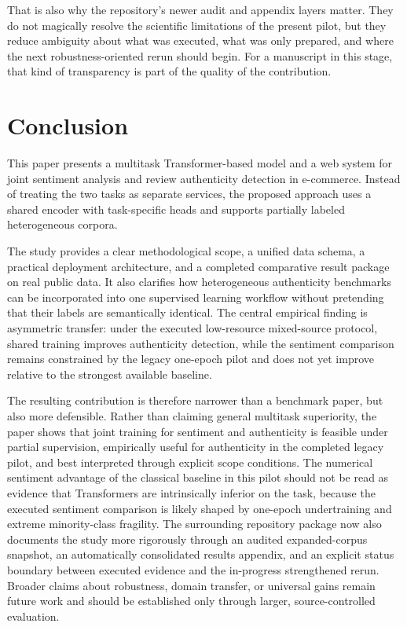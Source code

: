 \documentclass[12pt,a4paper]{article}
\begin{document}
That is also why the repository's newer audit and appendix layers matter. They do not magically resolve the scientific limitations of the present pilot, but they reduce ambiguity about what was executed, what was only prepared, and where the next robustness-oriented rerun should begin. For a manuscript in this stage, that kind of transparency is part of the quality of the contribution.

\section{Conclusion}

This paper presents a multitask Transformer-based model and a web system for joint sentiment analysis and review authenticity detection in e-commerce. Instead of treating the two tasks as separate services, the proposed approach uses a shared encoder with task-specific heads and supports partially labeled heterogeneous corpora.

The study provides a clear methodological scope, a unified data schema, a practical deployment architecture, and a completed comparative result package on real public data. It also clarifies how heterogeneous authenticity benchmarks can be incorporated into one supervised learning workflow without pretending that their labels are semantically identical. The central empirical finding is asymmetric transfer: under the executed low-resource mixed-source protocol, shared training improves authenticity detection, while the sentiment comparison remains constrained by the legacy one-epoch pilot and does not yet improve relative to the strongest available baseline.

The resulting contribution is therefore narrower than a benchmark paper, but also more defensible. Rather than claiming general multitask superiority, the paper shows that joint training for sentiment and authenticity is feasible under partial supervision, empirically useful for authenticity in the completed legacy pilot, and best interpreted through explicit scope conditions. The numerical sentiment advantage of the classical baseline in this pilot should not be read as evidence that Transformers are intrinsically inferior on the task, because the executed sentiment comparison is likely shaped by one-epoch undertraining and extreme minority-class fragility. The surrounding repository package now also documents the study more rigorously through an audited expanded-corpus snapshot, an automatically consolidated results appendix, and an explicit status boundary between executed evidence and the in-progress strengthened rerun. Broader claims about robustness, domain transfer, or universal gains remain future work and should be established only through larger, source-controlled evaluation.
\end{document}
